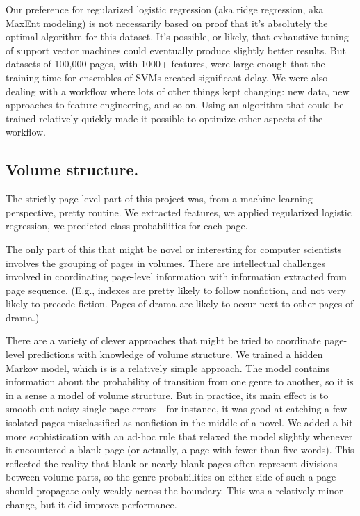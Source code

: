 \documentclass[paper=a4, fontsize=12pt]{scrartcl}
\numberwithin{equation}{section}		%
\numberwithin{figure}{section}			%
\numberwithin{table}{section}				%
\begin{document}
Our preference for regularized logistic regression (aka ridge regression, aka MaxEnt modeling) is not necessarily based on proof that it's absolutely the optimal algorithm for this dataset. It's possible, or likely, that exhaustive tuning of support vector machines could eventually produce slightly better results. But datasets of 100,000 pages, with 1000+ features, were large enough that the training time for ensembles of SVMs created significant delay. We were also dealing with a workflow where lots of other things kept changing: new data, new approaches to feature engineering, and so on. Using an algorithm that could be trained relatively quickly made it possible to optimize other aspects of the workflow.

\subsection{Volume structure.}

The strictly page-level part of this project was, from a machine-learning perspective, pretty routine. We extracted features, we applied regularized logistic regression, we predicted class probabilities for each page.

The only part of this that might be novel or interesting for computer scientists involves the grouping of pages in volumes. There are intellectual challenges involved in coordinating page-level information with information extracted from page sequence. (E.g., indexes are pretty likely to follow nonfiction, and not very likely to precede fiction. Pages of drama are likely to occur next to other pages of drama.)

There are a variety of clever approaches that might be tried to coordinate page-level predictions with knowledge of volume structure. We trained a hidden Markov model, which is is a relatively simple approach. The model contains information about the probability of transition from one genre to another, so it is in a sense a model of volume structure. But in practice, its main effect is to smooth out noisy single-page errors---for instance, it was good at catching a few isolated pages misclassified as nonfiction in the middle of a novel. We added a bit more sophistication with an ad-hoc rule that relaxed the model slightly whenever it encountered a blank page (or actually, a page with fewer than five words). This reflected the reality that blank or nearly-blank pages often represent divisions between volume parts, so the genre probabilities on either side of such a page should propagate only weakly across the boundary. This was a relatively minor change, but it did improve performance.
\end{document}
